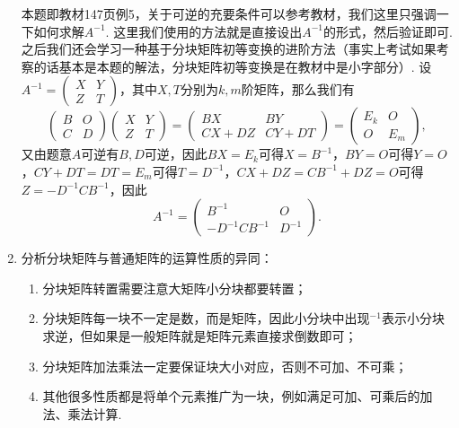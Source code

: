 \begin{enumerate}
          \begin{solution}
            本题即教材147页例5，关于可逆的充要条件可以参考教材，我们这里只强调一下如何求解$A^{-1}$. 这里我们使用的方法就是直接设出$A^{-1}$的形式，然后验证即可. 之后我们还会学习一种基于分块矩阵初等变换的进阶方法（事实上考试如果考察的话基本是本题的解法，分块矩阵初等变换是在教材中是小字部分）. 设$A^{-1}=\begin{pmatrix}
                X & Y \\ Z & T
            \end{pmatrix}$，其中$X,T$分别为$k,m$阶矩阵，那么我们有
            \[\begin{pmatrix}
                    B & O \\ C & D
                \end{pmatrix}\begin{pmatrix}
                    X & Y \\ Z & T
                \end{pmatrix}=\begin{pmatrix}
                    BX & BY \\ CX+DZ & CY+DT
                \end{pmatrix}=\begin{pmatrix}
                    E_k & O \\ O & E_m
                \end{pmatrix},\]
            又由题意$A$可逆有$B,D$可逆，因此$BX=E_k$可得$X=B^{-1}$，$BY=O$可得$Y=O$，$CY+DT=DT=E_m$可得$T=D^{-1}$，$CX+DZ=CB^{-1}+DZ=O$可得$Z=-D^{-1}CB^{-1}$，因此
            \[A^{-1}=\begin{pmatrix}
                    B^{-1} & O \\ -D^{-1}CB^{-1} & D^{-1}
                \end{pmatrix}.\]
          \end{solution}

    \item 分析分块矩阵与普通矩阵的运算性质的异同：
          \begin{enumerate}
              \item 分块矩阵转置需要注意大矩阵小分块都要转置；

              \item 分块矩阵每一块不一定是数，而是矩阵，因此小分块中出现$^{-1}$表示小分块求逆，但如果是一般矩阵就是矩阵元素直接求倒数即可；

              \item 分块矩阵加法乘法一定要保证块大小对应，否则不可加、不可乘；

              \item 其他很多性质都是将单个元素推广为一块，例如满足可加、可乘后的加法、乘法计算.
          \end{enumerate}
\end{enumerate}

